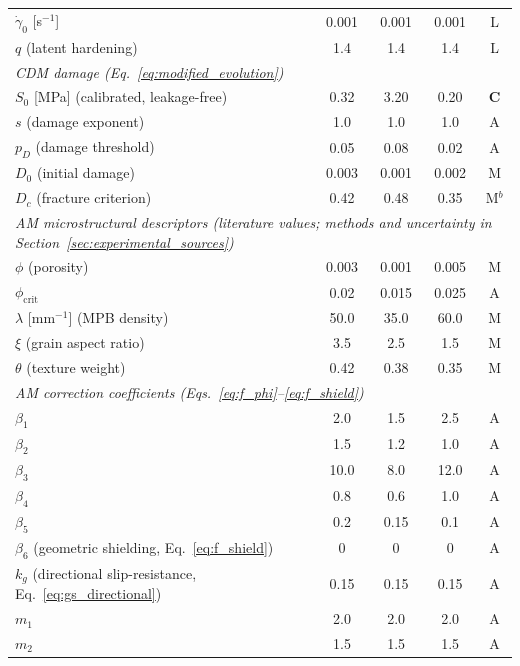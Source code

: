\begin{table}[htbp]
{\begin{tabular}{lcccc}
$\dot{\gamma}_0$ [s$^{-1}$] & 0.001 & 0.001 & 0.001 & L \\
$q$ (latent hardening) & 1.4 & 1.4 & 1.4 & L \\
\midrule
\multicolumn{5}{l}{\emph{CDM damage (Eq.~\eqref{eq:modified_evolution})}} \\
$S_0$ [MPa] (calibrated, leakage-free) & 0.32 & 3.20 & 0.20 & \textbf{C} \\
$s$ (damage exponent) & 1.0 & 1.0 & 1.0 & A \\
$p_D$ (damage threshold) & 0.05 & 0.08 & 0.02 & A \\
$D_0$ (initial damage) & 0.003 & 0.001 & 0.002 & M \\
$D_c$ (fracture criterion) & 0.42 & 0.48 & 0.35 & M$^{b}$ \\
\midrule
\multicolumn{5}{l}{\emph{AM microstructural descriptors (literature values; methods and uncertainty in Section~\ref{sec:experimental_sources})}} \\
$\phi$ (porosity) & 0.003 & 0.001 & 0.005 & M \\
$\phi_{\mathrm{crit}}$ & 0.02 & 0.015 & 0.025 & A \\
$\lambda$ [mm$^{-1}$] (MPB density) & 50.0 & 35.0 & 60.0 & M \\
$\xi$ (grain aspect ratio) & 3.5 & 2.5 & 1.5 & M \\
$\theta$ (texture weight) & 0.42 & 0.38 & 0.35 & M \\
\midrule
\multicolumn{5}{l}{\emph{AM correction coefficients (Eqs.~\eqref{eq:f_phi}--\eqref{eq:f_shield})}} \\
$\beta_1$ & 2.0 & 1.5 & 2.5 & A \\
$\beta_2$ & 1.5 & 1.2 & 1.0 & A \\
$\beta_3$ & 10.0 & 8.0 & 12.0 & A \\
$\beta_4$ & 0.8 & 0.6 & 1.0 & A \\
$\beta_5$ & 0.2 & 0.15 & 0.1 & A \\
$\beta_6$ (geometric shielding, Eq.~\eqref{eq:f_shield}) & 0 & 0 & 0 & A \\
$k_g$ (directional slip-resistance, Eq.~\eqref{eq:gs_directional}) & 0.15 & 0.15 & 0.15 & A \\
$m_1$ & 2.0 & 2.0 & 2.0 & A \\
$m_2$ & 1.5 & 1.5 & 1.5 & A \\
\bottomrule
\end{tabular}%
}


\end{table}
